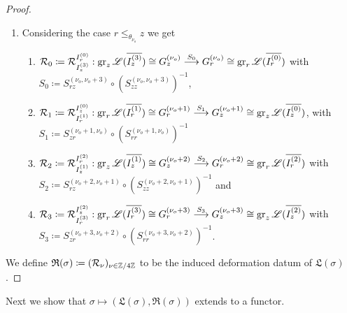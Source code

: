 \begin{proof}
\begin{enumerate}
\begin{enumerate}
\begin{enumerate}
\end{enumerate}
 \item Considering the case $r \leq_{\theta_{\nu_o}} z$ we get
\begin{enumerate}
        \item $\mathcal{R}_0 \coloneqq \mathcal{R}_{I_z^{(3)}}^{I_r^{(0)}}: \operatorname{gr}_z\mathscr{L}(\overline{I_z^{(3)}}) \cong G_z^{(\nu_o)} \overset{S_0}{\longrightarrow} G_r^{(\nu_o)} \cong \operatorname{gr}_r\mathscr{L}(\overline{I_r^{(0)}})$ with $S_0 \coloneqq S_{rz}^{(\nu_o,\nu_o+3)} \circ (S_{zz}^{(\nu_o,\nu_o+3)})^{-1}$,
        \item $\mathcal{R}_1 \coloneqq \mathcal{R}_{I_r^{(1)}}^{I_z^{(0)}}: \operatorname{gr}_r\mathscr{L}(\overline{I_r^{(1)}}) \cong G_r^{(\nu_o+1)} \overset{S_1}{\longrightarrow} G_z^{(\nu_o+1)} \cong \operatorname{gr}_z\mathscr{L}(\overline{I_z^{(0)}})$, with $S_1 \coloneqq S_{zr}^{(\nu_o+1, \nu_o)} \circ (S_{rr}^{(\nu_o+1,\nu_o)})^{-1}$ 
        \item $\mathcal{R}_2 \coloneqq \mathcal{R}_{I_z^{(1)}}^{I_r^{(2)}}: \operatorname{gr}_z\mathscr{L}(\overline{I_z^{(1)}}) \cong G_z^{(\nu_o+2)} \overset{S_2}{\longrightarrow} G_r^{(\nu_o+2)} \cong \operatorname{gr}_r\mathscr{L}(\overline{I_r^{(2)}})$ with $S_2 \coloneqq S_{rz}^{(\nu_o+2,\nu_o+1)} \circ (S_{zz}^{(\nu_o+2,\nu_o+1)})^{-1}$ and
        \item $\mathcal{R}_3 \coloneqq \mathcal{R}_{I_r^{(3)}}^{I_z^{(2)}}: \operatorname{gr}_r\mathscr{L}(\overline{I_r^{(3)}}) \cong G_r^{(\nu_o+3)} \overset{S_3}{\longrightarrow} G_z^{(\nu_o+3)} \cong \operatorname{gr}_z\mathscr{L}(\overline{I_z^{(2)}})$ with $S_3 \coloneqq S_{zr}^{(\nu_o+3, \nu_o+2)} \circ (S_{rr}^{(\nu_o+3,\nu_o+2)})^{-1}$.
\end{enumerate}
\end{enumerate}
\end{enumerate}

We define $\mathfrak{R}(\sigma) \coloneqq (\mathcal{R}_\nu)_{\nu \in \mathbb{Z}/4\mathbb{Z}}$ to be the induced deformation datum of $\mathfrak{L}(\sigma)$.
\end{proof}

Next we show that $\sigma \mapsto (\mathfrak{L}(\sigma), \mathfrak{R}(\sigma))$ extends to a functor.

